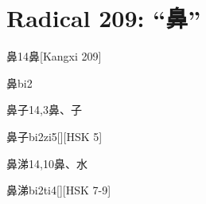
\section*{Radical 209: ``⿐''}

\begin{Entry}{鼻}{14}{⿐}[Kangxi 209]
  \begin{Phonetics}{鼻}{bi2}
  \end{Phonetics}
\end{Entry}

\begin{Entry}{鼻子}{14,3}{⿐、⼦}
  \begin{Phonetics}{鼻子}{bi2zi5}[][HSK 5]
  \end{Phonetics}
\end{Entry}

\begin{Entry}{鼻涕}{14,10}{⿐、⽔}
  \begin{Phonetics}{鼻涕}{bi2ti4}[][HSK 7-9]
  \end{Phonetics}
\end{Entry}


